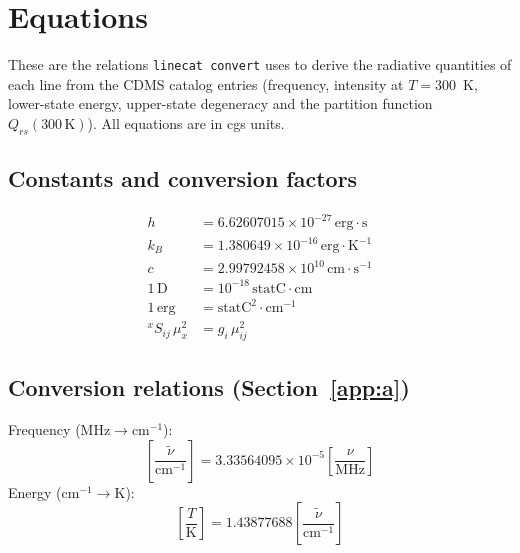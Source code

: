 \providecommand{\unit}[1]{\,\mathrm{#1}}
\providecommand{\inunit}[2]{\left[\frac{#1}{\mathrm{#2}}\right]}
\providecommand{\bz}[1]{e^{-#1/kT}}

\section{Equations}\label{app:equations}
These are the relations \texttt{linecat convert} uses to derive the radiative quantities of each line
from the CDMS catalog entries (frequency, intensity at $T=300$~K, lower-state energy, upper-state
degeneracy and the partition function $Q_{rs}(300\,\mathrm{K})$).
\textcolor{warnborder}{All equations are in cgs units.}

\subsection{Constants and conversion factors}
\begin{equation}
\begin{aligned}
  h   &= 6.62607015\times10^{-27}\unit{erg\cdot s}\\
  k_B &= 1.380649\times10^{-16}\unit{erg\cdot K^{-1}}\\
  c   &= 2.99792458\times10^{10}\unit{cm\cdot s^{-1}}\\
  1\unit{D} &= 10^{-18}\unit{statC\cdot cm}\\
  1\unit{erg} &= \mathrm{statC^2\cdot cm^{-1}}\\
  {}^{x}S_{ij}\,\mu_x^2 &= g_i\,\mu_{ij}^2
\end{aligned}
\end{equation}

\subsection{Conversion relations (Section~\ref{app:a})}
Frequency ($\mathrm{MHz}\to\mathrm{cm^{-1}}$):
\begin{equation}
  \inunit{\tilde\nu}{cm^{-1}} = 3.33564095\times10^{-5}\inunit{\nu}{MHz}
\end{equation}
Energy ($\mathrm{cm^{-1}}\to\mathrm{K}$):
\begin{equation}
  \inunit{T}{K} = 1.43877688\inunit{\tilde\nu}{cm^{-1}}
\end{equation}

